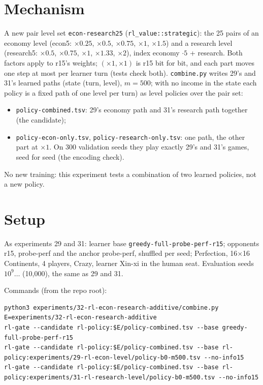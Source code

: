 \documentclass{../polyexp}
\begin{document}
\section{Mechanism}
A new pair level set \texttt{econ-research25} (\texttt{rl\_value::strategic}): the 25 pairs of an economy level
(econ5: $\times0.25$, $\times0.5$, $\times0.75$, $\times1$, $\times1.5$) and a research level (research5: $\times0.5$,
$\times0.75$, $\times1$, $\times1.33$, $\times2$), index economy $\cdot 5$ + research. Both factors apply to r15's
weights; $(\times1, \times1)$ is r15 bit for bit, and each part moves one step at most per learner turn (tests check
both). \texttt{combine.py} writes 29's and 31's learned paths (state (turn, level), $m = 500$; with no income in the
state each policy is a fixed path of one level per turn) as level policies over the pair set:
\begin{itemize}
  \item \texttt{policy-combined.tsv}: 29's economy path and 31's research path together (the candidate);
  \item \texttt{policy-econ-only.tsv}, \texttt{policy-research-only.tsv}: one path, the other part at $\times1$. On
        300 validation seeds they play exactly 29's and 31's games, seed for seed (the encoding check).
\end{itemize}
No new training: this experiment tests a combination of two learned policies, not a new policy.

\section{Setup}
As experiments 29 and 31: learner base \texttt{greedy-full-probe-perf-r15}; opponents r15, probe-perf and the anchor
probe-perf, shuffled per seed; Perfection, 16$\times$16 Continents, 4 players, Crazy, learner Xin-xi in the human
seat. Evaluation seeds $10^9\dots$ (10{,}000), the same as 29 and 31.

Commands (from the repo root):
\begin{verbatim}
python3 experiments/32-rl-econ-research-additive/combine.py
E=experiments/32-rl-econ-research-additive
rl-gate --candidate rl-policy:$E/policy-combined.tsv --base greedy-full-probe-perf-r15
rl-gate --candidate rl-policy:$E/policy-combined.tsv --base rl-policy:experiments/29-rl-econ-level/policy-b0-m500.tsv --no-info15
rl-gate --candidate rl-policy:$E/policy-combined.tsv --base rl-policy:experiments/31-rl-research-level/policy-b0-m500.tsv --no-info15
\end{verbatim}
\end{document}
